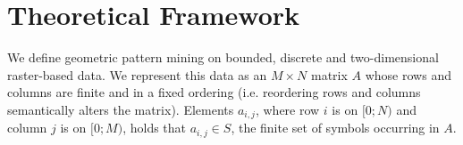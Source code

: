 \documentclass{llncs}
\begin{document}
\section{Theoretical Framework}



We define geometric pattern mining on bounded, discrete and two-dimensional raster-based data. We represent this data as an $M\times N$ matrix $A$ whose rows and columns are finite and in a fixed ordering (i.e. reordering rows and columns semantically alters the matrix). Elements $a_{i,j}$, where row $i$ is on $[0;N)$ and column $j$ is on $[0;M)$, holds that $a_{i,j} \in S$, the finite set of symbols occurring in $A$. %

\begin{figure}

\label{example1}
\end{figure}
\end{document}

